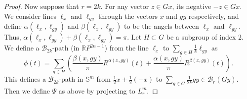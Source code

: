 \documentclass[10pt,a4paper]{amsart}
\begin{document}
\begin{proof}
Now suppose that $r=2k$.  For any vector $z\in Gx$, its negative $-z\in Gx$. We  consider lines $\ell_x$ and $\ell_{gy}$ through the vectors $x$ and $gy$ respectively, and define $\alpha(\ell_x,\ell_{gy})$ and $\beta(\ell_x,\ell_{gy})$ to be the angels between $\ell_x$ and $\ell_{gy}$. Thus,
$\alpha(\ell_x,\ell_{gy})+\beta(\ell_x,\ell_{gy})=\pi.$ Let $H\subset G$ be a subgroup of index 2. We define a $\mathcal B_{2k}$-path (in $\mathbb RP^{2n-1}$) from the line $\ell_x$ to $\sum_{g\in H}\frac{1}{k}\ell_{gy}$ as
$$
\phi(t)=\sum_{g\in H}\left(\frac{\beta(x,gy)}{\pi}R^{\alpha
(x,gy)}(t)+\frac{\alpha(x,gy)}{\pi}R^{\beta(x,gy)}(t)\right).
$$
This defines a $\mathcal B_{2k}$-path in $\mathbb S^m$ from $\frac{1}{2}x+\frac{1}{2}(-x)$ to $\sum_{g\in G}\frac{1}{2k}gy\in\mathcal B_r(Gy)$.
Then we define $\Psi$ as above by projecting to $L_r^m$.
\end{proof}
\end{document}
